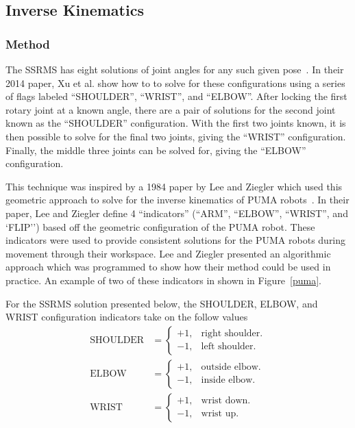 \documentclass{article}
\begin{document}
\subsection{Inverse Kinematics}
\subsubsection{Method}
The SSRMS has eight solutions of joint angles for any such given pose~\cite{xu2014analytical}.
In their 2014 paper, Xu et al. show how to to solve for these configurations using a series of flags labeled ``SHOULDER'', ``WRIST'', and ``ELBOW''.
After locking the first rotary joint at a known angle, there are a pair of solutions for the second joint known as the ``SHOULDER'' configuration.
With the first two joints known, it is then possible to solve for the final two joints, giving the ``WRIST'' configuration.
Finally, the middle three joints can be solved for, giving the ``ELBOW'' configuration.

This technique was inspired by a 1984 paper by Lee and Ziegler which used this geometric approach to solve for the inverse kinematics of PUMA robots~\cite{lee1984geometric}.
In their paper, Lee and Ziegler define 4 ``indicators'' (``ARM'', ``ELBOW'', ``WRIST'', and `FLIP'') based off the geometric configuration of the PUMA robot.
These indicators were used to provide consistent solutions for the PUMA robots during movement through their workspace.
Lee and Ziegler presented an algorithmic approach which was programmed to show how their method could be used in practice.
An example of two of these indicators in shown in Figure~\ref{puma}.

For the SSRMS solution presented below, the SHOULDER, ELBOW, and WRIST configuration indicators take on the follow values~\cite{xu2014analytical}
\begin{align*}
\text{SHOULDER}&=\begin{cases}
    +1, & \text{right shoulder}.\\
    -1, & \text{left shoulder}.
\end{cases}\\
\text{ELBOW}&=\begin{cases}
    +1, & \text{outside elbow}.\\
    -1, & \text{inside elbow}.
\end{cases}\\
\text{WRIST}&=\begin{cases}
    +1, & \text{wrist down}.\\
    -1, & \text{wrist up}.
\end{cases}
\end{align*}
\end{document}
